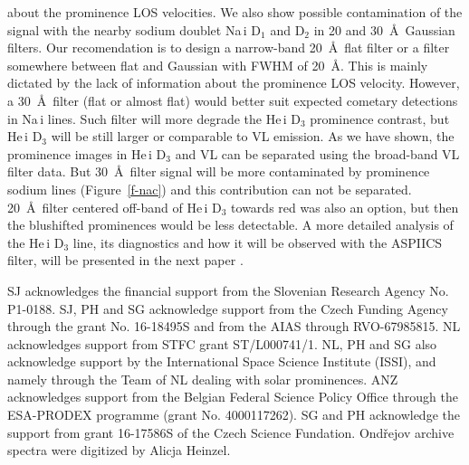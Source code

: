 \documentclass[namedreferences]{solarphysics}
\begin{document}
\begin{article}
about the prominence LOS velocities. 
We also show possible contamination of the signal with the nearby sodium doublet Na\,{\sc i} D$_{1}$ and D$_{2}$ in 20 and 30~\AA~Gaussian filters. 
Our recomendation is to design a narrow-band 20~\AA~flat filter or a filter
somewhere between flat and Gaussian with FWHM of 20~\AA. This is mainly dictated by the lack of information about the prominence LOS velocity.
However, a 30~\AA~filter (flat or almost flat) would better suit expected  cometary detections in Na\,{\sc i} lines. Such filter will more degrade the 
He\,{\sc i} D$_{3}$ prominence contrast, but He\,{\sc i} D$_3$ will be still larger or comparable to VL emission. As we have shown, the prominence images in 
He\,{\sc i} D$_3$  and VL can be separated using the broad-band VL filter data. But 30~\AA~filter signal will be more contaminated by prominence sodium lines 
(Figure~\ref{f-nac}) and this contribution can not be separated. 20~\AA~filter centered off-band of He\,{\sc i} D$_{3}$ towards red was also an option, 
but then the blushifted prominences would be less detectable.
A more detailed analysis of the He\,{\sc i} D$_{3}$ line, its diagnostics and how it will be observed with the ASPIICS filter, will be presented in the 
next paper \cite{Lab18}.  






\begin{acks}
SJ acknowledges the financial support from the Slovenian Research Agency No. P1-0188.
SJ, PH and SG acknowledge support from the Czech Funding Agency through the grant No. 16-18495S and from the AIAS 
through RVO-67985815. 
NL acknowledges support from STFC grant ST/L000741/1. 
NL, PH and SG also acknowledge support by the International Space Science Institute (ISSI), and namely through the 
Team of NL dealing with solar prominences. ANZ acknowledges support from the Belgian Federal Science Policy Office through the ESA-PRODEX programme (grant No. 4000117262). 
SG and PH acknowledge the support from grant 16-17586S of the Czech Science Fundation.
Ond\v{r}ejov archive spectra were digitized by Alicja Heinzel.
\end{acks}

\mbox{}~\\ 

 
 

  




\end{article} 
\end{document}

